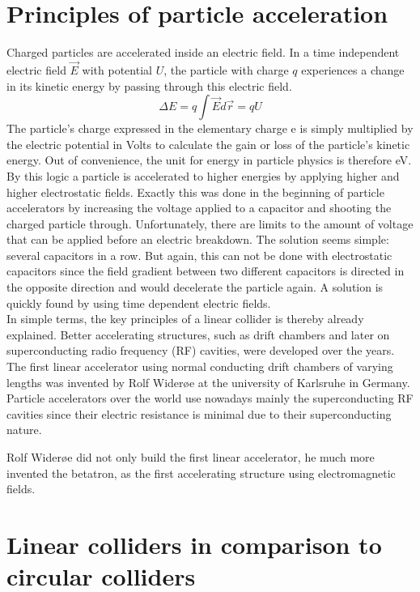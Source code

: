 \section{Principles of particle acceleration}
\label{AcceleratorPhysics}
Charged particles are accelerated inside an electric field. 
In a time independent electric field $\vec{E}$ with potential $U$, the particle with charge $q$ experiences a change in its kinetic energy by passing through this electric field.
\begin{equation}
 \Delta E = q \int \vec{E}d\vec{r} = qU
\end{equation}
The particle's charge expressed in the elementary charge e is simply multiplied by the electric potential in Volts to calculate the gain or loss of the particle's kinetic energy. 
Out of convenience, the unit for energy in particle physics is therefore eV.\\
By this logic a particle is accelerated to higher energies by applying higher and higher electrostatic fields. 
Exactly this was done in the beginning of particle accelerators by increasing the voltage applied to a capacitor and shooting the charged particle through. 
Unfortunately, there are limits to the amount of voltage that can be applied before an electric breakdown.
The solution seems simple: several capacitors in a row.
But again, this can not be done with electrostatic capacitors since the field gradient between two different capacitors is directed in the opposite direction and would decelerate the particle again.
A solution is quickly found by using time dependent electric fields.\\
In simple terms, the key principles of a linear collider is thereby already explained.
Better accelerating structures, such as drift chambers and later on superconducting radio frequency (RF) cavities, were developed over the years.
The first linear accelerator using normal conducting drift chambers of varying lengths was invented by Rolf Wider\o e at the university of Karlsruhe in Germany.
Particle accelerators over the world use nowadays mainly the superconducting RF cavities since their electric resistance is minimal due to their superconducting nature.

Rolf Wider\o e did not only build the first linear accelerator, he much more invented the betatron, as the first accelerating structure using electromagnetic fields.

\section{Linear colliders in comparison to circular colliders}
\label{Linear-Circular}
